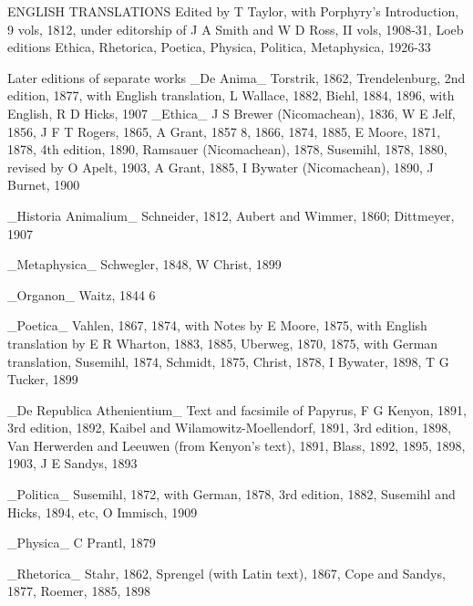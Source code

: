   ENGLISH TRANSLATIONS Edited by T Taylor, with Porphyry's
  Introduction, 9 vols, 1812, under editorship of J A Smith and
  W D Ross, II vols, 1908-31, Loeb editions Ethica, Rhetorica,
  Poetica, Physica, Politica, Metaphysica, 1926-33

  Later editions of separate works
  _De Anima_ Torstrik, 1862, Trendelenburg, 2nd edition, 1877,
  with English translation, L Wallace, 1882, Biehl, 1884, 1896, with
  English, R D Hicks, 1907
_Ethica_ J S Brewer (Nicomachean), 1836, W E Jelf, 1856, J F T Rogers,
1865, A Grant, 1857 8, 1866, 1874, 1885, E Moore, 1871, 1878, 4th
edition, 1890, Ramsauer (Nicomachean), 1878, Susemihl, 1878, 1880,
revised by O Apelt, 1903, A Grant, 1885, I Bywater (Nicomachean), 1890,
J Burnet, 1900

_Historia Animalium_ Schneider, 1812, Aubert and Wimmer, 1860;
Dittmeyer, 1907

_Metaphysica_ Schwegler, 1848, W Christ, 1899

_Organon_ Waitz, 1844 6

_Poetica_ Vahlen, 1867, 1874, with Notes by E Moore, 1875, with English
translation by E R Wharton, 1883, 1885, Uberweg, 1870, 1875, with
German translation, Susemihl, 1874, Schmidt, 1875, Christ, 1878, I
Bywater, 1898, T G Tucker, 1899

_De Republica Athenientium_ Text and facsimile of Papyrus, F G Kenyon,
1891, 3rd edition, 1892, Kaibel and Wilamowitz-Moellendorf, 1891, 3rd
edition, 1898, Van Herwerden and Leeuwen (from Kenyon's text), 1891,
Blass, 1892, 1895, 1898, 1903, J E Sandys, 1893

_Politica_ Susemihl, 1872, with German, 1878, 3rd edition, 1882,
Susemihl and Hicks, 1894, etc, O Immisch, 1909

_Physica_ C Prantl, 1879

_Rhetorica_ Stahr, 1862, Sprengel (with Latin text), 1867, Cope and
Sandys, 1877, Roemer, 1885, 1898

